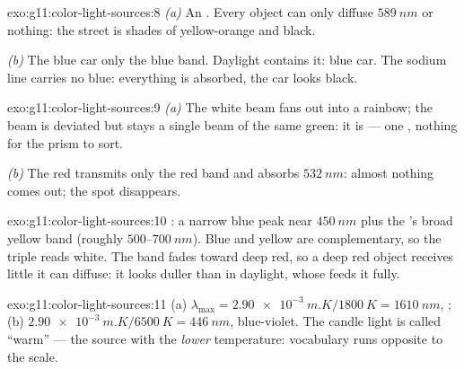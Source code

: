 \begin{solution}{exo:g11:color-light-sources:8}
\emph{(a)} An . Every object can only diffuse
$\qty{589}{nm}$ or nothing: the street is shades of yellow-orange and
black.

\emph{(b)} The blue car  only the blue band. Daylight contains
it: blue car. The sodium line carries no blue: everything is absorbed,
the car looks black.
\end{solution}

\begin{solution}{exo:g11:color-light-sources:9}
\emph{(a)} The white beam fans out into a rainbow; the  beam is
deviated but stays a single beam of the same green: it is 
--- one , nothing for the prism to sort.

\emph{(b)} The red  transmits only the red band and absorbs
$\qty{532}{nm}$: almost nothing comes out; the spot disappears.
\end{solution}

\begin{solution}{exo:g11:color-light-sources:10}
: a narrow blue peak near $\qty{450}{nm}$ plus the 's
broad yellow band (roughly $500$--$\qty{700}{nm}$). Blue and yellow are
complementary, so the  triple reads white. The band fades toward
deep red, so a deep red object receives little it can diffuse: it looks
duller than in daylight, whose  feeds it fully.
\end{solution}

\begin{solution}{exo:g11:color-light-sources:11}
(a) $\lambda_{\max} = \qty{2.90e-3}{m.K}/\qty{1800}{K}
= \qty{1610}{nm}$, ;
(b) $\qty{2.90e-3}{m.K}/\qty{6500}{K} = \qty{446}{nm}$, blue-violet.
The candle light is called ``warm'' --- the source with the
\emph{lower} temperature: vocabulary runs opposite to the  scale.
\end{solution}

